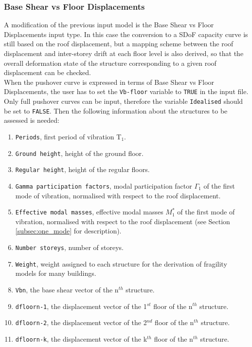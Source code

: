 \subsubsection{Base Shear vs Floor Displacements}
\label{subsubsec:VB-Dfloor}
A modification of the previous input model is the Base Shear vs Floor Displacements input type. In this case the conversion to a SDoF capacity curve is still based on the roof displacement, but a mapping scheme between the roof displacement and inter-storey drift at each floor level is also derived, so that the overall deformation state of the structure corresponding to a given roof displacement can be checked.\\
When the pushover curve is expressed in terms of Base Shear vs Floor Displacements, the user has to set the \verb=Vb-floor= variable to \verb=TRUE= in the input file. Only full pushover curves can be input, therefore the variable \verb=Idealised= should be set to \verb=FALSE=. Then the following information about the structures to be assessed is needed:\\

\begin{enumerate}
\item \verb=Periods=, first period of vibration T$_1$.
\item \verb=Ground height=, height of the ground floor.
\item \verb=Regular height=, height of the regular floors.
\item \verb=Gamma participation factors=, modal participation factor $\Gamma_1$ of the first mode of vibration, normalised with respect to the roof displacement.
\item \verb=Effective modal masses=, effective modal masses $M_{1}^{*}$ of the first mode of vibration, normalised with respect to the roof displacement (see Section \ref{subsec:one_mode} for description).
\item \verb=Number storeys=, number of storeys.
\item \verb=Weight=, weight assigned to each structure for the derivation of fragility models for many buildings.
\item \verb=Vbn=, the base shear vector of the n$^{th}$ structure.
\item \verb=dfloorn-1=, the displacement vector of the 1$^{st}$ floor of the n$^{th}$ structure.
\item \verb=dfloorn-2=, the displacement vector of the 2$^{nd}$ floor of the n$^{th}$ structure.
\item \verb=dfloorn-k=, the displacement vector of the k$^{th}$ floor of the n$^{th}$ structure. \\
\end{enumerate}

